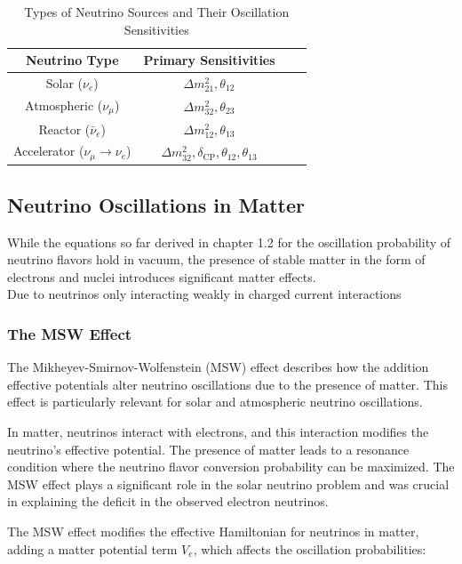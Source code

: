 \documentclass[a4paper,12pt,numbered]{article}
\begin{document}
\begin{table}[h!]
\centering
\begin{tabular}{|c|c|c|c|}
\hline
\textbf{Neutrino Type} & \textbf{Primary Sensitivities} \\ \hline
Solar (\(\nu_e\))& \(\Delta m_{21}^2, \theta_{12}\)\\ \hline
Atmospheric (\(\nu_\mu\))& \(\Delta m_{32}^2, \theta_{23}\) \\ \hline
Reactor (\(\bar{\nu}_e\))& \(\Delta m_{12}^2, \theta_{13}\)\\ \hline
Accelerator (\(\nu_\mu \to \nu_e\))& \(\Delta m_{32}^2, \delta_{\text{CP}}, \theta_{12}, \theta_{13}\) \\ \hline
\end{tabular}
\caption{Types of Neutrino Sources and Their Oscillation Sensitivities}

\end{table}

\subsection{Neutrino Oscillations in Matter}

While the equations so far derived in chapter 1.2 for the oscillation probability of neutrino flavors hold in vacuum, the presence of stable matter in the form of electrons and nuclei introduces significant matter effects.
\\
Due to neutrinos only interacting weakly in charged current interactions 

\subsubsection{The MSW Effect}

The Mikheyev-Smirnov-Wolfenstein (MSW) effect describes how the addition effective potentials alter neutrino oscillations due to the presence of matter. This effect is particularly relevant for solar and atmospheric neutrino oscillations.

In matter, neutrinos interact with electrons, and this interaction modifies the neutrino's effective potential. The presence of matter leads to a resonance condition where the neutrino flavor conversion probability can be maximized. The MSW effect plays a significant role in the solar neutrino problem and was crucial in explaining the deficit in the observed electron neutrinos.

The MSW effect modifies the effective Hamiltonian for neutrinos in matter, adding a matter potential term \( V_e \), which affects the oscillation probabilities:
\end{document}
